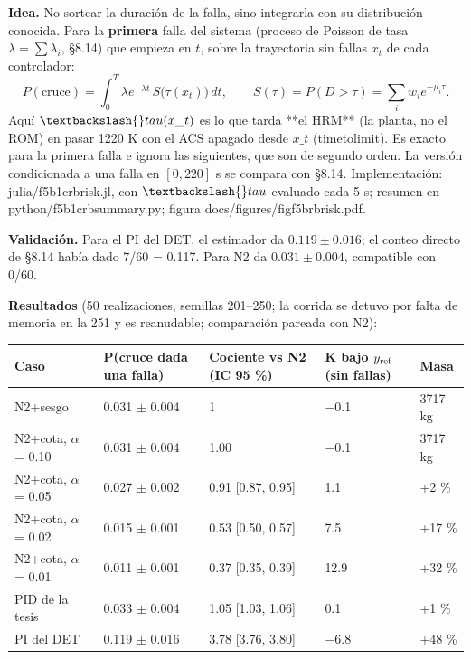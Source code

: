 \documentclass[11pt,a4paper]{article}
\newcommand{\codeus}{\textunderscore\allowbreak}
\newcommand{\code}[1]{{\small\ttfamily\let\_\codeus #1}}
\begin{document}
\textbf{Idea.} No sortear la duración de la falla, sino integrarla con su distribución conocida. Para la \textbf{primera} falla del sistema (proceso de Poisson de tasa $\lambda=\sum\lambda_i$, \S{}8.14) que empieza en $t$, sobre la trayectoria sin fallas $x_t$ de cada controlador: $$P(\text{cruce})=\int_0^T\lambda e^{-\lambda t}\,S\big(\tau(x_t)\big)\,dt,\qquad S(\tau)=P(D>\tau)=\sum_i w_i e^{-\mu_i\tau}.$$ Aquí $\textbackslash{}tau(x\_t)$ es lo que tarda **el HRM** (la planta, no el ROM) en pasar 1220 K con el ACS apagado desde $x\_t$ (\code{time\_to\_limit}). Es exacto para la primera falla e ignora las siguientes, que son de segundo orden. La versión condicionada a una falla en $[0, 220]$ s se compara con §8.14. Implementación: \code{julia/f5b1c\_rb\_risk.jl}, con $\textbackslash{}tau$ evaluado cada 5 s; resumen en \code{python/f5b1c\_rb\_summary.py}; figura \code{docs/figures/fig\_f5b\_rb\_risk.pdf}.

\textbf{Validación.} Para el PI del DET, el estimador da $0.119\pm0.016$; el conteo directo de \S{}8.14 había dado 7/60 = 0.117. Para N2 da $0.031\pm0.004$, compatible con 0/60.

\textbf{Resultados} (50 realizaciones, semillas 201–250; la corrida se detuvo por falta de memoria en la 251 y es reanudable; comparación pareada con N2):

{\footnotesize
\begin{xltabular}{\linewidth}{@{}YYYYY@{}}
\toprule
\textbf{Caso} & \textbf{P(cruce dada una falla)} & \textbf{Cociente vs N2 (IC 95 \%)} & \textbf{K bajo $y_{\rm ref}$ (sin fallas)} & \textbf{Masa} \\
\midrule
\endhead
N2+sesgo & 0.031 $\pm$ 0.004 & 1 & $-$0.1 & 3717 kg \\
N2+cota, $\alpha$ = 0.10 & 0.031 $\pm$ 0.004 & 1.00 & $-$0.1 & 3717 kg \\
N2+cota, $\alpha$ = 0.05 & 0.027 $\pm$ 0.002 & 0.91 [0.87, 0.95] & 1.1 & +2 \% \\
N2+cota, $\alpha$ = 0.02 & 0.015 $\pm$ 0.001 & 0.53 [0.50, 0.57] & 7.5 & +17 \% \\
N2+cota, $\alpha$ = 0.01 & 0.011 $\pm$ 0.001 & 0.37 [0.35, 0.39] & 12.9 & +32 \% \\
PID de la tesis & 0.033 $\pm$ 0.004 & 1.05 [1.03, 1.06] & 0.1 & +1 \% \\
PI del DET & 0.119 $\pm$ 0.016 & 3.78 [3.76, 3.80] & $-$6.8 & +48 \% \\
\bottomrule
\end{xltabular}}
\end{document}
